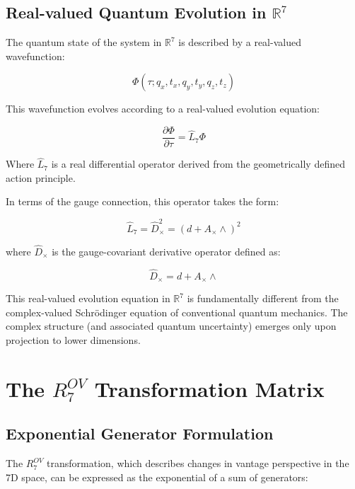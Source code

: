 \documentclass{article}
\begin{document}
\subsection{Real-valued Quantum Evolution in $\mathbb{R}^7$}

The quantum state of the system in $\mathbb{R}^7$ is described by a real-valued wavefunction:

\begin{equation}
\Phi(\tau; q_x, t_x, q_y, t_y, q_z, t_z)
\end{equation}

This wavefunction evolves according to a real-valued evolution equation:

\begin{equation}
\frac{\partial \Phi}{\partial \tau} = \hat{L}_7 \Phi
\end{equation}

Where $\hat{L}_7$ is a real differential operator derived from the geometrically defined action principle.

In terms of the gauge connection, this operator takes the form:

\begin{equation}
\hat{L}_7 = \hat{D}_\times^2 = (d + A_\times \wedge)^2
\end{equation}

where $\hat{D}_\times$ is the gauge-covariant derivative operator defined as:

\begin{equation}
\hat{D}_\times = d + A_\times \wedge
\end{equation}

This real-valued evolution equation in $\mathbb{R}^7$ is fundamentally different from the complex-valued Schrödinger equation of conventional quantum mechanics. The complex structure (and associated quantum uncertainty) emerges only upon projection to lower dimensions.

\section{The $R^{OV}_7$ Transformation Matrix}

\subsection{Exponential Generator Formulation}

The $R^{OV}_7$ transformation, which describes changes in vantage perspective in the 7D space, can be expressed as the exponential of a sum of generators:
\end{document}
